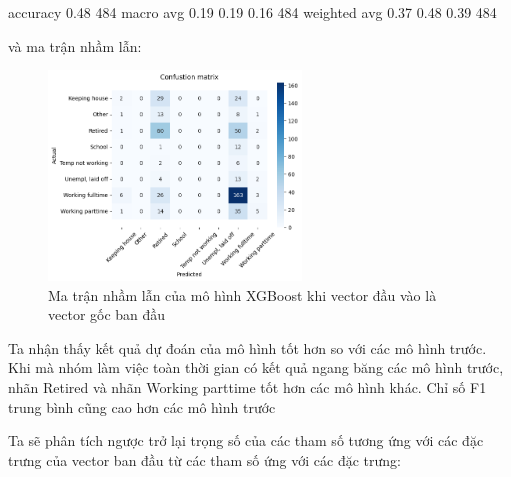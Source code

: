 \begin{enumerate}[label=(\alph*)]
\begin{python}
        accuracy                           0.48       484
       macro avg       0.19      0.19      0.16       484
    weighted avg       0.37      0.48      0.39       484

    \end{python}

    và ma trận nhầm lẫn:

    \begin{figure}[H]
        \centering
        \includegraphics[width=0.6\textwidth]{figures/Thanh/Models/XGBoost/With_null_models_confusion_matrix_XGBoost_original_features.png}
        \caption{Ma trận nhầm lẫn của mô hình XGBoost khi vector đầu vào là vector gốc ban đầu}
        \label{fig:With_null_models_confusion_matrix_XGBoost_original_features}
    \end{figure}

    Ta nhận thấy kết quả dự đoán của mô hình tốt hơn so với các mô hình trước.
    Khi mà nhóm làm việc toàn thời gian có kết quả ngang băng các mô hình trước,
    nhãn Retired và nhãn Working parttime tốt hơn các mô hình khác.
    Chỉ số F1 trung bình cũng cao hơn các mô hình trước
    
    Ta sẽ phân tích ngược trở lại trọng số của các tham số tương ứng với các đặc trưng của vector ban đầu từ các tham số ứng với các đặc trưng:


\end{enumerate}
